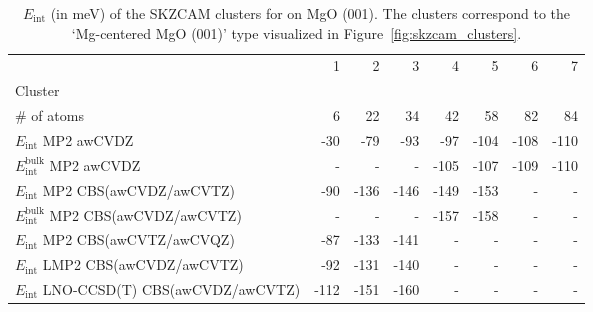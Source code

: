 \begin{table}
\caption{\label{tab:system_eint_mgo_c2h6}$E_\textrm{int}$ (in meV) of the SKZCAM clusters for  on MgO (001). The clusters correspond to the `Mg-centered MgO (001)' type visualized in Figure~\ref{fig:skzcam_clusters}.}
\begin{adjustbox}{center,max width=1.4\textwidth}
\begin{tabular}{lrrrrrrr}
\toprule
 & 1 & 2 & 3 & 4 & 5 & 6 & 7 \\ 
Cluster &  &  &  &  &  &  &  \\
\midrule
\# of atoms & 6 & 22 & 34 & 42 & 58 & 82 & 84 \\
$E_\textrm{int}$ MP2 awCVDZ & -30 & -79 & -93 & -97 & -104 & -108 & -110 \\
$E_\textrm{int}^\textrm{bulk}$ MP2 awCVDZ & - & - & - & -105 & -107 & -109 & -110 \\
$E_\textrm{int}$ MP2 CBS(awCVDZ/awCVTZ) & -90 & -136 & -146 & -149 & -153 & - & - \\
$E_\textrm{int}^\textrm{bulk}$ MP2 CBS(awCVDZ/awCVTZ) & - & - & - & -157 & -158 & - & - \\
$E_\textrm{int}$ MP2 CBS(awCVTZ/awCVQZ) & -87 & -133 & -141 & - & - & - & - \\
$E_\textrm{int}$ LMP2 CBS(awCVDZ/awCVTZ) & -92 & -131 & -140 & - & - & - & - \\
$E_\textrm{int}$ LNO-CCSD(T) CBS(awCVDZ/awCVTZ) & -112 & -151 & -160 & - & - & - & - \\
\bottomrule
\end{tabular}
\end{adjustbox}
\end{table}

